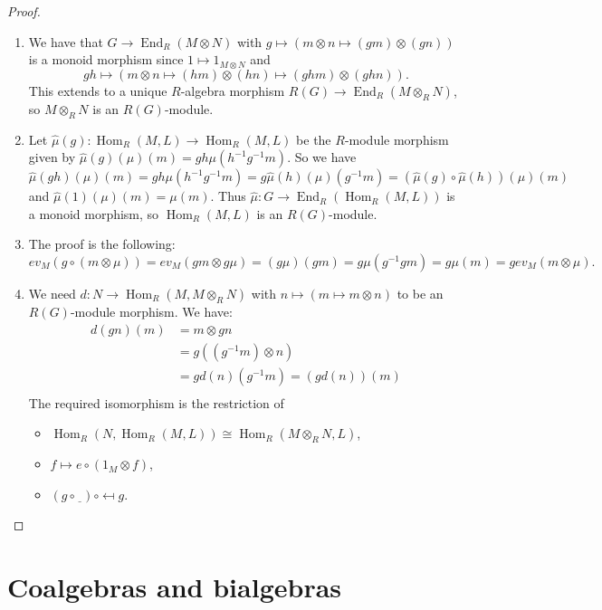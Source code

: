 \documentclass[8pt]{article}
\theoremstyle{definition}
\theoremstyle{definition}
\theoremstyle{definition}
\theoremstyle{definition}
\theoremstyle{definition}
\theoremstyle{definition}
\theoremstyle{definition}
\theoremstyle{definition}
\theoremstyle{definition}
\theoremstyle{definition}
\theoremstyle{definition}
\theoremstyle{definition}
\theoremstyle{definition}
\theoremstyle{definition}
\theoremstyle{question}
\begin{document}
\begin{proof}
  \begin{enumerate}
    \item We have that $G \to \operatorname{End}_R(M \otimes N)$ with $g \mapsto (m \otimes n \mapsto (gm) \otimes (gn))$ is
    a monoid morphism since $1 \mapsto 1_{M \otimes N}$ and
    \[
    gh \mapsto (m \otimes n \mapsto (hm) \otimes (hn) \mapsto (ghm) \otimes (ghn)).
    \]
    This extends to a unique $R$-algebra morphism $R(G) \to \operatorname{End}_R(M \otimes_R N)$, so $M \otimes_R N$ is an $R(G)$-module.
    \item Let $\hat{\mu}(g) : \operatorname{Hom}_R(M,L) \to \operatorname{Hom}_R(M,L)$ be the $R$-module morphism given by
    $\hat{\mu}(g)(\mu)(m) = gh\mu(h^{-1}g^{-1}m)$. So we have 
    \[\hat{\mu}(gh)(\mu)(m) = gh\mu(h^{-1}g^{-1}m) = g\hat{\mu}(h)(\mu)(g^{-1}m) = (\hat{\mu}(g) \circ \hat{\mu}(h))(\mu)(m)
    \]
    and $\hat{\mu}(1)(\mu)(m) = \mu(m)$. Thus $\hat{\mu} : G \to \operatorname{End}_R(\operatorname{Hom}_R(M,L))$ is a monoid morphism,
    so $\operatorname{Hom}_R(M,L)$ is an $R(G)$-module.
    \item The proof is the following:
    \[
    ev_M(g \circ (m \otimes \mu)) = ev_M(gm \otimes g\mu) = (g\mu)(gm) = g \mu (g^{-1} g m) = g \mu (m) = g ev_M(m \otimes \mu).
    \]
    \item We need $d : N \to \operatorname{Hom}_R(M, M \otimes_R N)$ with $n \mapsto (m \mapsto m \otimes n)$ to be an $R(G)$-module morphism. We have:
    \begin{align*}
      d(gn)(m) &= m \otimes g n \\
      &= g ((g^{-1} m) \otimes n) \\
      &= g d (n) (g^{-1} m) = (gd(n))(m) \\
    \end{align*}
    The required isomorphism is the restriction of
    \begin{itemize}
      \item $\operatorname{Hom}_R(N, \operatorname{Hom}_R(M,L)) \cong \operatorname{Hom}_R(M \otimes_R N, L)$,
      \item $f \mapsto e \circ (1_M \otimes f)$,
      \item $(g \circ \underline{\:\:}) \circ \mapsfrom g$.
    \end{itemize}
  \end{enumerate}
\end{proof}

\section{Coalgebras and bialgebras}
\end{document}

